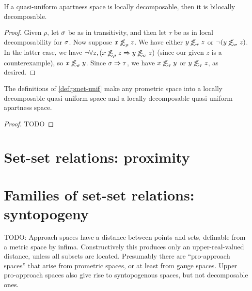 \documentclass{article}
\def\oapt{\mathrel{\!\not\,\not\lesssim}}
\let\implies\Rightarrow
\begin{document}
\begin{thm}
  If a quasi-uniform apartness space is locally decomposable, then it is bilocally decomposable.
\end{thm}
\begin{proof}
  Given $\rho$, let $\sigma$ be as in transitivity, and then let $\tau$ be as in local decomposability for $\sigma$.
  Now suppose $x\oapt_\rho z$.
  We have either $y\oapt_\tau z$ or $\neg(y\oapt_\si z)$.
  In the latter case, we have $\neg\forall z,(x\oapt_\rho z \implies y\oapt_\si z)$ (since our given $z$ is a counterexample), so $x\oapt_\si y$.
  Since $\si\implies\tau$, we have $x\oapt_\tau y$ or $y\oapt_\tau z$, as desired.
\end{proof}

\begin{thm}
  The definitions of \cref{def:pmet-unif} make any prometric space into a locally decomposable quasi-uniform space and a locally decomposable quasi-uniform apartness space.
\end{thm}
\begin{proof}
  TODO
\end{proof}







\section{Set-set relations: proximity}
\label{sec:set-set}
\label{sec:proximity}



\section{Families of set-set relations: syntopogeny}
\label{sec:syntopogeny}

TODO: Approach spaces have a distance between points and sets, definable from a metric space by infima.
Constructively this produces only an upper-real-valued distance, unless all subsets are located.
Presumably there are ``pro-approach spaces'' that arise from prometric spaces, or at least from gauge spaces.
Upper pro-approach spaces also give rise to syntopogenous spaces, but not decomposable ones.
\end{document}
